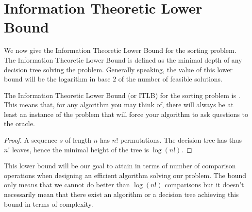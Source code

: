 \section{Information Theoretic Lower Bound}
\label{tree:sorting:ITLB}

We now give the Information Theoretic Lower Bound for the sorting problem. The
Information Theoretic Lower Bound is defined as the minimal depth of any
decision tree solving the problem. Generally speaking, the value of this lower
bound will be the logarithm in base \(2\) of the number of feasible solutions.


\begin{theorem}
The Information Theoretic Lower Bound (or ITLB) for the sorting problem is
. This means that, for any algorithm you may think of,
there will always be at least an instance of the problem that will force your
algorithm to ask  questions to the oracle.
\end{theorem}

\begin{proof}
A sequence $s$ of length $n$ has $n!$ permutations. The decision tree has thus
$n!$ leaves, hence the minimal height of the tree is $\log(n!)$.
\end{proof}

This lower bound will be our goal to attain in terms of number of comparison
operations when designing an efficient algorithm solving our problem. The
bound only means that we cannot do better than \(\log(n!)\) comparisons but it
doesn't necessarily mean that there exist an algorithm or a decision tree
achieving this bound in terms of complexity.
